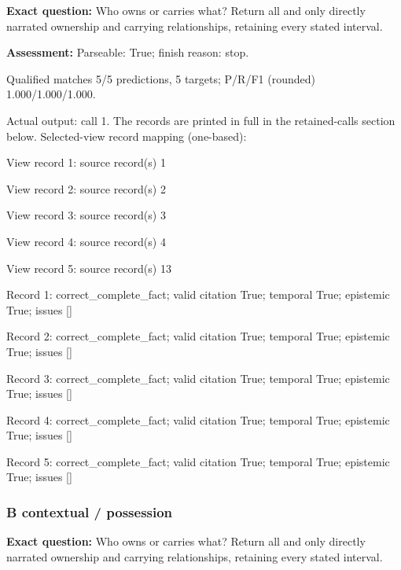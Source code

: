 \noindent\textbf{Exact question:} Who owns or carries what? Return all and only directly narrated ownership and carrying relationships, retaining every stated interval.\par

\noindent\textbf{Assessment:} Parseable: True; finish reason: stop.

Qualified matches 5/5 predictions, 5 targets; P/R/F1 (rounded) 1.000/1.000/1.000.\par

Actual output: call 1. The records are printed in full in the retained-calls section below. Selected-view record mapping (one-based):

View record 1: source record(s) 1\par

View record 2: source record(s) 2\par

View record 3: source record(s) 3\par

View record 4: source record(s) 4\par

View record 5: source record(s) 13\par

Record 1: correct\_complete\_fact; valid citation True; temporal True; epistemic True; issues []\par

Record 2: correct\_complete\_fact; valid citation True; temporal True; epistemic True; issues []\par

Record 3: correct\_complete\_fact; valid citation True; temporal True; epistemic True; issues []\par

Record 4: correct\_complete\_fact; valid citation True; temporal True; epistemic True; issues []\par

Record 5: correct\_complete\_fact; valid citation True; temporal True; epistemic True; issues []\par

\subsubsection*{B contextual / possession}

\noindent\textbf{Exact question:} Who owns or carries what? Return all and only directly narrated ownership and carrying relationships, retaining every stated interval.\par

